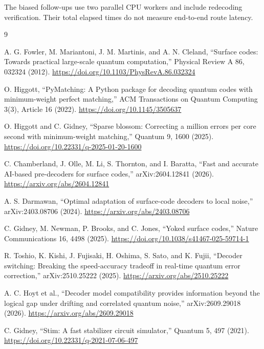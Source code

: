 \documentclass[aps,prd,12pt,twocolumn,superscriptaddress,floatfix]{revtex4-2}
\begin{document}
The biased follow-ups use two parallel CPU workers and include redecoding verification. Their total elapsed times do not measure end-to-end route latency.

\begin{thebibliography}{9}
\raggedright
{}
A. G. Fowler, M. Mariantoni, J. M. Martinis, and A. N. Cleland, “Surface codes: Towards practical large-scale quantum computation,” Physical Review A 86, 032324 (2012). \url{https://doi.org/10.1103/PhysRevA.86.032324}

O. Higgott, “PyMatching: A Python package for decoding quantum codes with minimum-weight perfect matching,” ACM Transactions on Quantum Computing 3(3), Article 16 (2022). \url{https://doi.org/10.1145/3505637}

O. Higgott and C. Gidney, “Sparse blossom: Correcting a million errors per core second with minimum-weight matching,” Quantum 9, 1600 (2025). \url{https://doi.org/10.22331/q-2025-01-20-1600}

C. Chamberland, J. Olle, M. Li, S. Thornton, and I. Baratta, “Fast and accurate AI-based pre-decoders for surface codes,” arXiv:2604.12841 (2026). \url{https://arxiv.org/abs/2604.12841}

A. S. Darmawan, “Optimal adaptation of surface-code decoders to local noise,” arXiv:2403.08706 (2024). \url{https://arxiv.org/abs/2403.08706}

C. Gidney, M. Newman, P. Brooks, and C. Jones, “Yoked surface codes,” Nature Communications 16, 4498 (2025). \url{https://doi.org/10.1038/s41467-025-59714-1}

R. Toshio, K. Kishi, J. Fujisaki, H. Oshima, S. Sato, and K. Fujii, “Decoder switching: Breaking the speed-accuracy tradeoff in real-time quantum error correction,” arXiv:2510.25222 (2025). \url{https://arxiv.org/abs/2510.25222}

A. C. Hoyt et al., “Decoder model compatibility provides information beyond the logical gap under drifting and correlated quantum noise,” arXiv:2609.29018 (2026). \url{https://arxiv.org/abs/2609.29018}

C. Gidney, “Stim: A fast stabilizer circuit simulator,” Quantum 5, 497 (2021). \url{https://doi.org/10.22331/q-2021-07-06-497}

\end{thebibliography}
\end{document}
